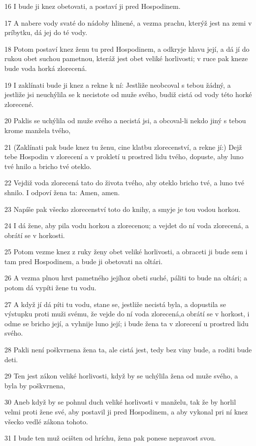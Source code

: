 \par 16 I bude ji knez obetovati, a postaví ji pred Hospodinem.
\par 17 A nabere vody svaté do nádoby hlinené, a vezma prachu, kterýž jest na zemi v príbytku, dá jej do té vody.
\par 18 Potom postaví knez ženu tu pred Hospodinem, a odkryje hlavu její, a dá jí do rukou obet suchou pametnou, kteráž jest obet veliké horlivosti; v ruce pak kneze bude voda horká zlorecená.
\par 19 I zaklínati bude ji knez a rekne k ní: Jestliže neobcoval s tebou žádný, a jestliže jsi neuchýlila se k necistote od muže svého, budiž cistá od vody této horké zlorecené.
\par 20 Paklis se uchýlila od muže svého a necistá jsi, a obcoval-li nekdo jiný s tebou krome manžela tvého,
\par 21 (Zaklínati pak bude knez tu ženu, cine klatbu zlorecenství, a rekne jí:) Dejž tebe Hospodin v zlorecení a v prokletí u prostred lidu tvého, dopuste, aby luno tvé hnilo a bricho tvé oteklo.
\par 22 Vejdiž voda zlorecená tato do života tvého, aby oteklo bricho tvé, a luno tvé shnilo. I odpoví žena ta: Amen, amen.
\par 23 Napíše pak všecko zlorecenství toto do knihy, a smyje je tou vodou horkou.
\par 24 I dá žene, aby pila vodu horkou a zlorecenou; a vejdet do ní voda zlorecená, a obrátí se v horkosti.
\par 25 Potom vezme knez z ruky ženy obet veliké horlivosti, a obraceti ji bude sem i tam pred Hospodinem, a bude ji obetovati na oltári.
\par 26 A vezma plnou hrst pametného jejíhoz obeti suché, páliti to bude na oltári; a potom dá vypíti žene tu vodu.
\par 27 A když jí dá píti tu vodu, stane se, jestliže necistá byla, a dopustila se výstupku proti muži svému, že vejde do ní voda zlorecená,a obrátí se v horkost, i odme se bricho její, a vyhnije luno její; i bude žena ta v zlorecení u prostred lidu svého.
\par 28 Pakli není poškvrnena žena ta, ale cistá jest, tedy bez viny bude, a roditi bude deti.
\par 29 Ten jest zákon veliké horlivosti, když by se uchýlila žena od muže svého, a byla by poškvrnena,
\par 30 Aneb když by se pohnul duch veliké horlivosti v manželu, tak že by horlil velmi proti žene své, aby postavil ji pred Hospodinem, a aby vykonal pri ní knez všecko vedlé zákona tohoto.
\par 31 I bude ten muž ocišten od hríchu, žena pak ponese nepravost svou.

